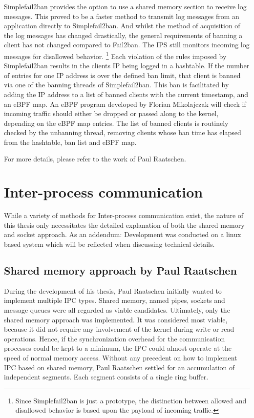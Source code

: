 Simplefail2ban provides the option to use a shared memory section to receive log messages.
This proved to be a faster method to transmit log messages from an application directly to Simplefail2ban.
And whilst the method of acquisition of the log messages has changed drastically, the general requirements of banning a client has not changed compared to Fail2ban.
The IPS still monitors incoming log messages for disallowed behavior. \footnote{Since Simplefail2ban is just a prototype, the distinction between allowed and disallowed behavior is based upon the payload of incoming traffic.}
Each violation of the rules imposed by Simplefail2ban results in the clients IP being logged in a hashtable.
If the number of entries for one IP address is over the defined ban limit, that client is banned via one of the banning threads of Simplefail2ban.
This ban is facilitated by adding the IP address to a list of banned clients with the current timestamp, and an eBPF map.
An eBPF program developed by Florian Mikolajczak will check if incoming traffic should either be dropped or passed along to the kernel, depending on the eBPF map entries.
The list of banned clients is routinely checked by the unbanning thread, removing clients whose ban time has elapsed from the hashtable, ban list and eBPF map.

For more details, please refer to the work of Paul Raatschen\cite{raatschen:ipc}.

\section{Inter-process communication}
While a variety of methods for Inter-process communication exist, the nature of this thesis only necessitates the detailed explanation of both the shared memory and socket approach.
As an addendum\@: Development was conducted on a linux based system which will be reflected when discussing technical details.

\subsection{Shared memory approach by Paul Raatschen}
During the development of his thesis, Paul Raatschen initially wanted to implement multiple IPC types.
Shared memory, named pipes, sockets and message queues were all regarded as viable candidates.
Ultimately, only the shared memory approach was implemented.
It was considered most viable, because it did not require any involvement of the kernel during write or read operations.
Hence, if the synchronization overhead for the communication processes could be kept to a minimum, the IPC could almost operate at the speed of normal memory access.
Without any precedent on how to implement IPC based on shared memory, Paul Raatschen settled for an accumulation of independent segments.
Each segment consists of a single ring buffer.\cite{raatschen:ipc}

